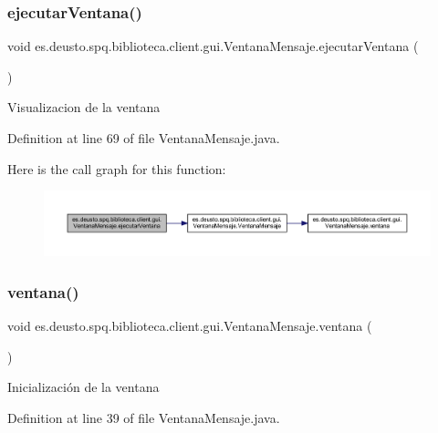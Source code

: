 \subsubsection{\texorpdfstring{ejecutar\+Ventana()}{ejecutarVentana()}}
{\footnotesize\ttfamily void es.\+deusto.\+spq.\+biblioteca.\+client.\+gui.\+Ventana\+Mensaje.\+ejecutar\+Ventana (\begin{DoxyParamCaption}{ }\end{DoxyParamCaption})}

Visualizacion de la ventana 

Definition at line 69 of file Ventana\+Mensaje.\+java.

Here is the call graph for this function\+:
\nopagebreak
\begin{figure}[H]
\begin{center}
\leavevmode
\includegraphics[width=350pt]{classes_1_1deusto_1_1spq_1_1biblioteca_1_1client_1_1gui_1_1_ventana_mensaje_ac2c22018c35286343654d228dc5010cb_cgraph}
\end{center}
\end{figure}
\mbox{\label{classes_1_1deusto_1_1spq_1_1biblioteca_1_1client_1_1gui_1_1_ventana_mensaje_a6e1e53edc811caa880731fd36f304bd2}} 
\subsubsection{\texorpdfstring{ventana()}{ventana()}}
{\footnotesize\ttfamily void es.\+deusto.\+spq.\+biblioteca.\+client.\+gui.\+Ventana\+Mensaje.\+ventana (\begin{DoxyParamCaption}{ }\end{DoxyParamCaption})}

Inicialización de la ventana 

Definition at line 39 of file Ventana\+Mensaje.\+java.

